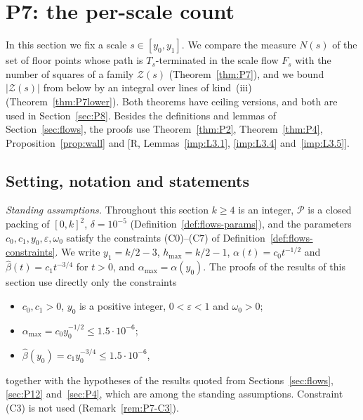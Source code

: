 \documentclass[11pt]{amsart}
\newcommand{\eps}{\varepsilon}
\newcommand{\cP}{\mathcal P}
\newcommand{\cZ}{\mathcal Z}
\newcommand{\amax}{\alpha_{\max}}
\newcommand{\hmax}{h_{\max}}
\newcommand{\Fs}{F_{s}}
\theoremstyle{definition}
\theoremstyle{remark}
\numberwithin{equation}{section}
\begin{document}
\section{P7: the per-scale count}\label{sec:P7}

In this section we fix a scale $s\in[y_0,y_1]$. We compare the measure $N(s)$ of the set of floor points whose path is $T_s$-terminated in the scale flow $\Fs$ with the number of squares of a family $\cZ(s)$ (Theorem~\ref{thm:P7}), and we bound $|\cZ(s)|$ from below by an integral over lines of kind~(iii) (Theorem~\ref{thm:P7lower}). Both theorems have ceiling versions, and both are used in Section~\ref{sec:P8}. Besides the definitions and lemmas of Section~\ref{sec:flows}, the proofs use Theorem~\ref{thm:P2}, Theorem~\ref{thm:P4}, Proposition~\ref{prop:wall} and [R, Lemmas~\ref{imp:L3.1}, \ref{imp:L3.4} and~\ref{imp:L3.5}].

\subsection{Setting, notation and statements}\label{ssec:P7-setting}

\emph{Standing assumptions.} Throughout this section $k\ge4$ is an integer, $\cP$ is a closed packing of $[0,k]^2$, $\delta=10^{-5}$ (Definition~\ref{def:flows-params}), and the parameters $c_0,c_1,y_0,\eps,\omega_0$ satisfy the constraints (C0)--(C7) of Definition~\ref{def:flows-constraints}. We write $y_1=k/2-3$, $\hmax=k/2-1$, $\alpha(t)=c_0t^{-1/2}$ and $\hat\beta(t)=c_1t^{-3/4}$ for $t>0$, and $\amax=\alpha(y_0)$. The proofs of the results of this section use directly only the constraints
\begin{itemize}
\item[(C0)] $c_0,c_1>0$, $y_0$ is a positive integer, $0<\eps<1$ and $\omega_0>0$;
\item[(C1)] $\amax=c_0y_0^{-1/2}\le1.5\cdot10^{-6}$;
\item[(C2)] $\hat\beta(y_0)=c_1y_0^{-3/4}\le1.5\cdot10^{-6}$,
\end{itemize}
together with the hypotheses of the results quoted from Sections~\ref{sec:flows}, \ref{sec:P12} and~\ref{sec:P4}, which are among the standing assumptions. Constraint (C3) is not used (Remark~\ref{rem:P7-C3}).
\end{document}
